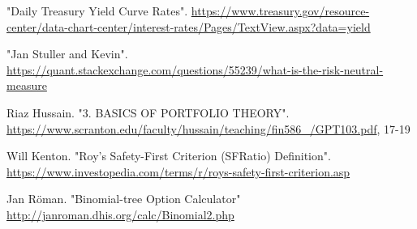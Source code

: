 \documentclass[12pt, letterpaper]{article}\usepackage{float}
\begin{document}
\begin{thebibliography}{9}
    "Daily Treasury Yield Curve Rates".
    \href{https://www.treasury.gov/resource-center/data-chart-center/interest-rates/Pages/TextView.aspx?data=yield}{https://www.treasury.gov/resource-center/data-chart-center/interest-rates/Pages/TextView.aspx?data=yield}

    "Jan Stuller and Kevin". \\
    \href{https://quant.stackexchange.com/questions/55239/what-is-the-risk-neutral-measure}{https://quant.stackexchange.com/questions/55239/what-is-the-risk-neutral-measure}

    Riaz Hussain.
    "3. BASICS OF PORTFOLIO THEORY". \\
    \href{https://www.scranton.edu/faculty/hussain/teaching/fin586\_/GPT103.pdf}{https://www.scranton.edu/faculty/hussain/teaching/fin586\_/GPT103.pdf},
    17-19

    Will Kenton.
    "Roy's Safety-First Criterion (SFRatio) Definition". \\
    \href{https://www.investopedia.com/terms/r/roys-safety-first-criterion.asp}{https://www.investopedia.com/terms/r/roys-safety-first-criterion.asp}

    Jan R\"{o}man.
    "Binomial-tree Option Calculator" \\
    \href{http://janroman.dhis.org/calc/Binomial2.php}{http://janroman.dhis.org/calc/Binomial2.php
}


\end{thebibliography}
\end{document}
